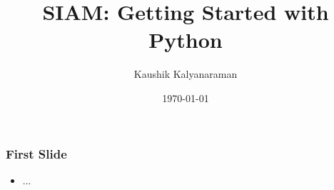 \documentclass{beamer}
\title{SIAM: Getting Started with Python}
\author{Kaushik Kalyanaraman}
\date{\today}
\begin{document}
\frame{\titlepage}

\frame
{
  \frametitle{First Slide}

  \begin{itemize}
  \item ...
  \end{itemize}
}
\end{document}
